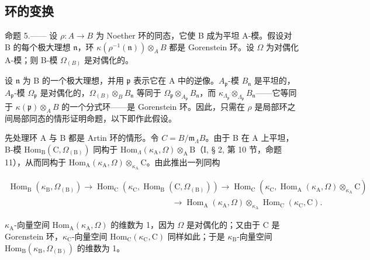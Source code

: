 \subsection{环的变换}

命题 5.—— 设 \(\rho: A \to B\) 为 Noether 环的同态，它使 B 成为平坦 A-模。假设对 B 的每个极大理想 \(\mathfrak{n}\)，环 \(\kappa(\rho^{-1}(\mathfrak{n})) \otimes_{A} B\) 都是 Gorenstein 环。设 \(\Omega\) 为对偶化 A-模；则 B-模 \(\Omega_{(B)}\) 是对偶化的。

设 \(\mathfrak{n}\) 为 B 的一个极大理想，并用 \(\mathfrak{p}\) 表示它在 A 中的逆像。\(A_{\mathfrak{p}}\)-模 \(B_{\mathfrak{n}}\) 是平坦的，\(A_{\mathfrak{p}}\)-模 \(\Omega_{\mathfrak{p}}\) 是对偶化的，\(\Omega_{(B)} \otimes_B B_{\mathfrak{n}}\) 等同于 \(\Omega_{\mathfrak{p}} \otimes_{A_{\mathfrak{p}}} B_{\mathfrak{n}}\)，而 \(\kappa_{\Lambda_{\mathfrak{p}}} \otimes_{\Lambda_{\mathfrak{p}}} B_{\mathfrak{n}}\)——它等同于 \(\kappa(\mathfrak{p}) \otimes_A B\) 的一个分式环——是 Gorenstein 环。因此，只需在 \(\rho\) 是局部环之间局部同态的情形证明命题，以下即作此假设。

先处理环 A 与 B 都是 Artin 环的情形。令 \(C = B / \mathfrak{m}_{\Lambda}B\)。由于 B 在 A 上平坦，B-模 \(\mathrm{Hom}_{\mathrm{B}}(\mathrm{C},\Omega_{(\mathrm{B})})\) 同构于 \(\mathrm{Hom}_{\Lambda}(\kappa_{\mathrm{A}},\Omega)\otimes_{\mathrm{A}}\mathrm{B}\)（I, § 2, 第 10 节，命题 11），从而同构于 \(\mathrm{Hom}_{\mathrm{A}}(\kappa_{\mathrm{A}},\Omega)\otimes_{\kappa_{\mathrm{A}}}\mathrm{C}\)。由此推出一列同构

\[
\begin{array}{c} \operatorname{Hom} _ {\mathrm{B}} (\kappa_ {\mathrm{B}}, \Omega_ {(\mathrm{B})}) \longrightarrow \operatorname{Hom} _ {\mathrm{C}} (\kappa_ {\mathrm{C}}, \operatorname{Hom} _ {\mathrm{B}} (\mathrm{C}, \Omega_ {(\mathrm{B})})) \longrightarrow \operatorname{Hom} _ {\mathrm{C}} (\kappa_ {\mathrm{C}}, \operatorname{Hom} _ {\mathrm{A}} (\kappa_ {\mathrm{A}}, \Omega) \otimes_ {\kappa_ {\mathrm{A}}} \mathrm{C}) \\ \qquad \qquad \qquad \qquad \qquad \qquad \qquad \qquad \qquad \qquad \longrightarrow \operatorname{Hom} _ {\mathrm{A}} (\kappa_ {\mathrm{A}}, \Omega) \otimes_ {\kappa_ {\mathrm{A}}} \operatorname{Hom} _ {\mathrm{C}} (\kappa_ {\mathrm{C}}, \mathrm{C}). \end{array}
\]

\(\kappa_{\mathrm{A}}\)-向量空间 \(\mathrm{Hom}_{\mathrm{A}}(\kappa_{\mathrm{A}}, \Omega)\) 的维数为 1，因为 \(\Omega\) 是对偶化的；又由于 C 是 Gorenstein 环，\(\kappa_{\mathrm{C}}\)-向量空间 \(\mathrm{Hom}_{\mathrm{C}}(\kappa_{\mathrm{C}}, \mathrm{C})\) 同样如此；于是 \(\kappa_{\mathrm{B}}\)-向量空间 \(\mathrm{Hom}_{\mathrm{B}}(\kappa_{\mathrm{B}}, \Omega_{(\mathrm{B})})\) 的维数为 1。

